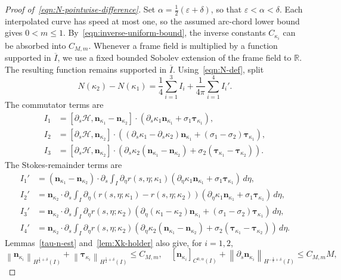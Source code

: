 \documentclass[11pt,reqno]{amsart}
\theoremstyle{plain}
\theoremstyle{definition}
\numberwithin{equation}{section}
\newcommand{\paren}[1]{\left(#1\right)}
\newcommand{\p}{\partial}
\newcommand{\mc}[1]{\mathcal{#1}}
\newcommand{\bm}[1]{\boldsymbol{#1}}
\newcommand{\norm}[1]{\left\lVert #1 \right\rVert}
\newcommand{\tka}[1]{\bm\tau_{\kappa_{#1}}}
\newcommand{\nka}[1]{\bm n_{\kappa_{#1}}}
\newcommand{\ci}[1]{C^{#1}(I)}
\newcommand{\hi}[1]{H^{#1}(I)}
\begin{document}
\begin{proof}[Proof of~\eqref{eqn:N-pointwise-difference}]
Set $\alpha=\frac{1}{2}\paren{\varepsilon+\delta}$, so that
$\varepsilon<\alpha<\delta$. Each interpolated curve has speed at most one,
so the assumed arc-chord lower bound gives $0<m\le1$.
By~\eqref{eqn:inverse-uniform-bound}, the inverse constants $C_{\kappa_i}$
can be absorbed into $C_{M,m}$.
Whenever a frame field is multiplied by a function supported in
$\overline I$, we use a fixed bounded Sobolev extension of the frame field
to $\mathbb R$. The resulting function remains supported in $\overline I$.
Using~\eqref{eqn:N-def}, split
\begin{equation}
    N(\kappa_2) - N(\kappa_1) = \frac{1}{4} \sum_{i=1}^3 I_i +\frac{1}{4\pi} \sum_{i=1}^4 I_i'.
\end{equation}
The commutator terms are
\begin{align}
    I_1 &=[\p_s\mc H, \nka{1}-\nka{2}]\cdot\paren{\p_s\kappa_1\nka{1} +\sigma_1\tka{1}},\\
    I_2 &= [\p_s\mc H, \nka{2}]\cdot\paren{(\p_s\kappa_1-\p_s\kappa_2)\nka{1} + (\sigma_1-\sigma_2)\tka{1}},\\
    I_3 &= [\p_s\mc H, \nka{2}]\cdot\paren{\p_s\kappa_2(\nka{1}-\nka{2}) +\sigma_2(\tka{1}-\tka{2})}.
\end{align}
The Stokes-remainder terms are
\begin{align}
    I_1' &= (\nka{1}-\nka{2})\cdot\p_s\int_I \p_\eta r(s,\eta;\kappa_1) \paren{ \p_\eta\kappa_1\nka{1}+\sigma_1\tka{1} } \,d\eta, \\
    I_2' &= \nka{2}\cdot\p_s\int_I \p_\eta (r(s,\eta;\kappa_1)-r(s,\eta;\kappa_2)) \paren{ \p_\eta\kappa_1\nka{1}+\sigma_1\tka{1} } \,d\eta,\\
    I_3' &= \nka{2}\cdot\p_s\int_I \p_\eta r(s,\eta;\kappa_2) \paren{ \p_\eta(\kappa_1-\kappa_2)\nka{1}+(\sigma_1-\sigma_2)\tka{1} } \,d\eta,\\
    I_4' &= \nka{2}\cdot\p_s\int_I \p_\eta r(s,\eta;\kappa_2) \paren{ \p_\eta\kappa_2(\nka{1}-\nka{2})+\sigma_2(\tka{1}-\tka{2}) } \,d\eta.
\end{align}
Lemmas~\ref{tau-n-est} and~\ref{lem:Xk-holder} also give, for $i=1,2$,
\begin{equation}\label{eqn:N-frame-bounds}
    \norm{\nka{i}}_{\hi{\frac{1}{2}+\delta}}
    +\norm{\tka{i}}_{\hi{\frac{1}{2}+\delta}}
    \le C_{M,m},\quad
    [\nka{i}]_{\ci{0,\alpha}}
    +\norm{\p_s\nka{i}}_{\hi{-\frac{1}{2}+\delta}}
    \le C_{M,m}M,
\end{equation}

\end{proof}
\end{document}
